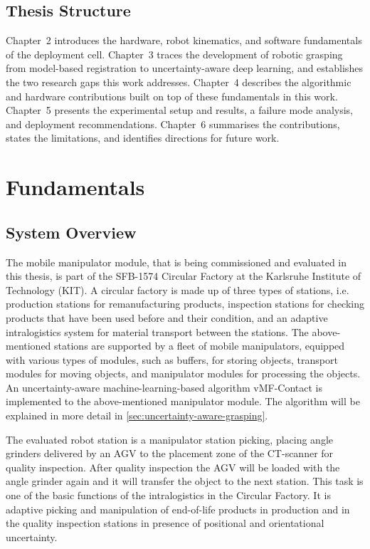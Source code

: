\documentclass[oneside,studentpaper]{wbk}
\begin{document}
\section{Thesis Structure}
\label{thesis-structure}

Chapter~2 introduces the hardware, robot kinematics, and software fundamentals of the deployment cell. Chapter~3 traces the development of robotic grasping from model-based registration to uncertainty-aware deep learning, and establishes the two research gaps this work addresses. Chapter~4 describes the algorithmic and hardware contributions built on top of these fundamentals in this work. Chapter~5 presents the experimental setup and results, a failure mode analysis, and deployment recommendations. Chapter~6 summarises the contributions, states the limitations, and identifies directions for future work.


\chapter{Fundamentals}
\label{chap:fundamentals}

\section{System Overview}
\label{sec:system-overview}

The mobile manipulator module, that is being commissioned and evaluated in this thesis, is part of the SFB-1574 Circular Factory at the Karlsruhe Institute of Technology (KIT). A circular factory is made up of three types of stations, i.e. production stations for remanufacturing products, inspection stations for checking products that have been used before and their condition, and an adaptive intralogistics system for material transport between the stations. The above-mentioned stations are supported by a fleet of mobile manipulators, equipped with various types of modules, such as buffers, for storing objects, transport modules for moving objects, and manipulator modules for processing the objects. An uncertainty-aware machine-learning-based algorithm vMF-Contact is implemented to the above-mentioned manipulator module. The algorithm will be explained in more detail in \cref{sec:uncertainty-aware-grasping}.

The evaluated robot station is a manipulator station picking, placing angle grinders delivered by an AGV to the placement zone of the CT-scanner for quality inspection. After quality inspection the AGV will be loaded with the angle grinder again and it will transfer the object to the next station. This task is one of the basic functions of the intralogistics in the Circular Factory. It is adaptive picking and manipulation of end-of-life products in production and in the quality inspection stations in presence of positional and orientational uncertainty.
\end{document}
